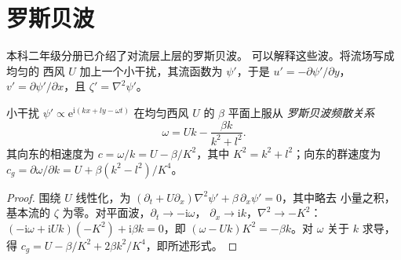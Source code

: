 \section{罗斯贝波}\label{sec:b3:atmospheric-dynamics:rossby}

本科二年级分册已介绍了对流层上层的罗斯贝波。
可以解释这些波。将流场写成均匀的
西风 $U$ 加上一个小干扰，其流函数为 $\psi'$，于是
$u' = -\partial\psi'/\partial y$，$v' = \partial\psi'/\partial x$，且 $\zeta'
= \nabla^2\psi'$。

\begin{theorem}[罗斯贝波的频散]\label{thm:b3:atmospheric-dynamics:rossby}
小干扰 $\psi' \propto \mathrm e^{\mathrm i(kx + ly - \omega t)}$
在均匀西风 $U$ 的 $\beta$ 平面上服从
\emph{罗斯贝波频散关系}
\[
\omega = Uk - \frac{\beta k}{k^2 + l^2} .
\]
其向东的相速度为 $c = \omega/k = U - \beta/K^2$，其中 $K^2 =
k^2 + l^2$；向东的群速度为 $c_g = \partial\omega/\partial
k = U + \beta(k^2 - l^2)/K^4$。
\end{theorem}

\begin{proof}
围绕 $U$ 线性化，为
$(\partial_t + U\partial_x)\nabla^2\psi' + \beta\,\partial_x\psi' = 0$，其中略去
小量之积，基本流的 $\zeta$
为零。对平面波，$\partial_t \to -\mathrm i\omega$，
$\partial_x \to \mathrm ik$，$\nabla^2 \to -K^2$：$(-\mathrm i\omega +
\mathrm iUk)(-K^2) + \mathrm i\beta k = 0$，即 $(\omega - Uk)K^2 =
-\beta k$。对 $\omega$ 关于 $k$ 求导，得 $c_g = U -
\beta/K^2 + 2\beta k^2/K^4$，即所述形式。
\end{proof}

